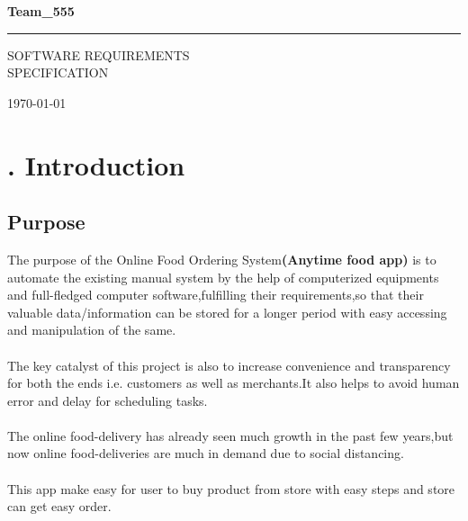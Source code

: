 \documentclass{scrreprt}
\date{}
\begin{document}
\begin{titlepage}
\vspace*{\fill}
\begin{center}

    \Huge{\textbf{Team_555}}
\end{center}

\vspace*{\fill}
  
\end{titlepage}
\cleardoublepage
\begin{flushright}
    \rule{16cm}{5pt}\vskip1cm
    \begin{bfseries}
        \Huge{SOFTWARE REQUIREMENTS\\ SPECIFICATION}\\
        \vspace{1.5cm}
        \vspace{1.5cm}
        
        \vspace{1.5cm}
      \today\\
        \vspace{1.5cm}
        \vspace{1.5cm}
        \vspace{1.5cm}
        
    \end{bfseries}
\end{flushright}

\tableofcontents

\chapter{. Introduction}

\section{Purpose}
The purpose of the Online Food Ordering System\textbf{(Anytime food app)} is to automate the existing manual system by the help of computerized equipments and full-fledged computer software,fulfilling their requirements,so that their valuable data/information can be stored for a longer period with easy accessing and manipulation of the same.\\ \\
The key catalyst of this project is also to increase convenience and transparency for both the ends i.e. customers as well as merchants.It also helps to avoid human error and delay for scheduling tasks.\\ \\
The online food-delivery has already seen much growth in the past few years,but now online food-deliveries are much in demand due to social distancing.\\ \\
This app make easy for user to buy product
from store with easy steps and store can get easy order.
\end{document}
